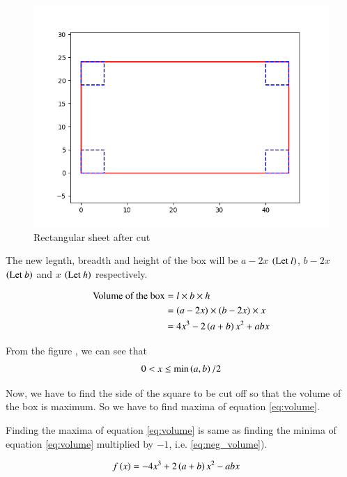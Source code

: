 \documentclass[journal,12pt,twocolumn]{IEEEtran}
\begin{document}
\begin{figure}[!htb]
    \centering
    \includegraphics[width=\columnwidth]{figs/rectangle2.png}
    \caption{Rectangular sheet after cut}
    \label{fig:rectangular sheet cut}
\end{figure}

The new legnth, breadth and height of the box will be $a-2x$ $\left(\text{Let }l\right)$, $b-2x$ $\left(\text{Let }b\right)$ and $x$ $\left(\text{Let }h\right)$ respectively.

\begin{align}
    \text{Volume of the box} &= l \times b \times h \\
    & = (a-2x) \times (b-2x) \times x \\
    \label{eq:volume} & = 4x^3 - 2\left(a+b\right)x^2 + abx
\end{align}

From the figure , we can see that
\begin{align}
    \label{eq:x_range}
    0 < x \leq \min\left(a,b\right)/2
\end{align}

Now, we have to find the side of the square to be cut off so that the volume of the box is maximum. So we have to find maxima of equation \eqref{eq:volume}.

Finding the maxima of equation \eqref{eq:volume} is same as finding the minima of equation \eqref{eq:volume} multiplied by $-1$, i.e. \eqref{eq:neg_volume}).

\begin{align}
    \label{eq:neg_volume}
    f\left(x\right) &= -4x^3 + 2\left(a+b\right)x^2 - abx
\end{align}
\end{document}
